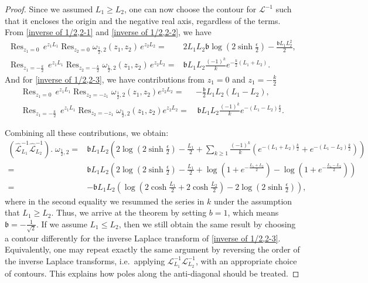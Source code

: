 \documentclass[10pt,a4paper]{amsart}
\DeclareMathOperator*{\Res}{Res}
\begin{document}
\begin{proof}
Since we assumed $L_1\geq L_2$, one can now choose the contour for $\mathcal{L}^{-1}$ such that it encloses the origin and the negative real axis, regardless of the terms. From \eqref{inverse of 1/2,2-1} and \eqref{inverse of 1/2,2-2}, we have
\begin{align}
\Res_{z_1=0} \,e^{z_1L_1}\Res_{z_2=0}\omega_{\frac12,2}(z_1,z_2)\,e^{z_2L_2}=&2L_1L_2\mathfrak{b}\log\left(2\sinh\frac{\epsilon}{2}\right)-\frac{\mathfrak{b}L_1L_2^2}{2},\label{inverse of 1/2,2-4}\\
      \Res_{z_1=-\frac{k}{2}} \,e^{z_1L_1} \Res_{z_2=-\frac{k}{2}}\omega_{\frac12,2}(z_1,z_2)\,e^{z_2L_2}=&\mathfrak{b}L_1L_2\frac{(-1)^k}{k}e^{-\frac{k}{2}(L_1+L_2)}.\label{inverse of 1/2,2-5}
\end{align}
And for \eqref{inverse of 1/2,2-3}, we have contributions from $z_1=0$ and $z_1=-\frac{k}{2}$
    \begin{align*}
        \Res_{z_1=0}\,e^{z_1L_1} \Res_{z_2=-z_1}\omega_{\frac12,2}(z_1,z_2)e^{z_2L_2}=&-\frac{\mathfrak{b}}{2}L_1L_2(L_1-L_2),\\
        \Res_{z_1=-\frac{k}{2}}\,e^{z_1L_1} \Res_{z_2=-z_1}\omega_{\frac12,2}(z_1,z_2)e^{z_2L_2}=&\,\mathfrak{b}L_1L_2\frac{(-1)^k}{k}e^{-(L_1-L_2)\frac{k}{2}}.
    \end{align*}

Combining all these contributions, we obtain:
\begin{align*}
    (\hat{\mathcal{L}}_{L_1}^{-1} \hat{\mathcal{L}}_{L_2}^{-1}).\;\omega_{\frac12,2}=&\mathfrak{b}L_1L_2\left(2\log\left(2\sinh\frac{\epsilon}{2}\right)-\frac{L_1}{2}+\sum_{k\geq1}\frac{(-1)^k}{k}\left(e^{-(L_1+L_2)\frac{k}{2}}+e^{-(L_1-L_2)\frac{k}{2}}\right)\right)\nonumber\\
    =&\mathfrak{b}L_1L_2\left(2\log\left(2\sinh\frac{\epsilon}{2}\right)-\frac{L_1}{2}+\log\left(1+e^{-\frac{L_1+L_2}{2}}\right)-\log\left(1+e^{-\frac{L_1-L_2}{2}}\right)\right)\nonumber\\
    =&-\mathfrak{b}L_1L_2\left(\log\left(2\cosh\frac{L_1}{2}+2\cosh\frac{L_2}{2}\right)-2\log\left(2\sinh\frac{\epsilon}{2}\right)\right),
\end{align*}
where in the second equality we resummed the series in $k$ under the assumption that $L_1\geq L_2$. Thus, we arrive at the theorem by setting $b=1$, which means $\mathfrak{b}=-\frac{1}{\sqrt{2}}$. If we assume $L_1\leq L_2$, then we still obtain the same result by choosing a contour differently for the inverse Laplace transform of \eqref{inverse of 1/2,2-3}. Equivalently, one may repeat exactly the same argument by reversing the order of the inverse Laplace transforms, i.e.~applying $\mathcal{L}^{-1}_{L_1}\mathcal{L}^{-1}_{L_2}$, with an appropriate choice of contours. This explains how poles along the anti-diagonal should be treated.
\end{proof}
\end{document}
